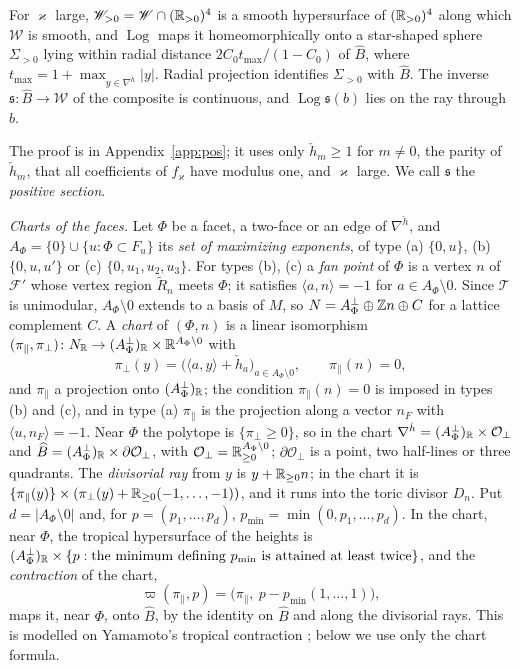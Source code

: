 \begin{lemma}\label{lem:pos}
For $\varkappa$ large, $\mathscr W_{>0}=\mathscr W\cap(\mathbb R_{>0})^4$ is a smooth hypersurface of $(\mathbb R_{>0})^4$ along which $\mathscr W$ is smooth, and
$\operatorname{Log}$ maps it homeomorphically onto a star-shaped sphere $\Sigma_{>0}$ lying within radial distance
$2C_0t_{\max}/(1-C_0)$ of $\widehat B$, where $t_{\max}=1+\max_{y\in\nabla^{\check h}}|y|$. Radial projection identifies
$\Sigma_{>0}$ with $\widehat B$. The inverse $\mathfrak s\colon\widehat B\to \mathscr W$ of the composite is continuous, and
$\operatorname{Log}\mathfrak s(b)$ lies on the ray through $b$.
\end{lemma}
The proof is in Appendix~\ref{app:pos}; it uses only $\check h_m\ge1$ for $m\neq0$, the parity of $\check h_m$, that all
coefficients of $f_\varkappa$ have modulus one, and $\varkappa$ large. We call $\mathfrak s$ the \emph{positive section}.

\emph{Charts of the faces.} Let $\Phi$ be a facet, a two-face or an edge of $\nabla^{\check h}$, and
$A_\Phi=\{0\}\cup\{u:\Phi\subset F_u\}$ its \emph{set of maximizing exponents}, of type (a) $\{0,u\}$, (b) $\{0,u,u'\}$ or (c)
$\{0,u_1,u_2,u_3\}$. For types (b), (c) a \emph{fan point} of $\Phi$ is a vertex $n$ of $\mathcal F'$ whose vertex region
$\widetilde R_n$ meets $\Phi$; it satisfies $\langle a,n\rangle=-1$ for $a\in A_\Phi\setminus0$. Since $\mathcal T$ is
unimodular, $A_\Phi\setminus0$ extends to a basis of $M$, so $N=A_\Phi^\perp\oplus\mathbb Z n\oplus C$ for a lattice complement
$C$. A \emph{chart} of $(\Phi,n)$ is a linear isomorphism
$(\pi_\parallel,\pi_\perp)\colon N_\mathbb R\to(A_\Phi^\perp)_\mathbb R\times\mathbb R^{A_\Phi\setminus0}$ with
\[
\pi_\perp(y)=\bigl(\langle a,y\rangle+\check h_a\bigr)_{a\in A_\Phi\setminus0},\qquad \pi_\parallel(n)=0 ,
\]
and $\pi_\parallel$ a projection onto $(A_\Phi^\perp)_\mathbb R$; the condition $\pi_\parallel(n)=0$ is imposed in types (b) and
(c), and in type (a) $\pi_\parallel$ is the projection along a vector $n_F$ with $\langle u,n_F\rangle=-1$. Near $\Phi$ the
polytope is $\{\pi_\perp\ge0\}$, so in the chart $\nabla^{\check h}=(A^\perp_\Phi)_\mathbb R\times\mathcal O_\perp$ and
$\widehat B=(A^\perp_\Phi)_\mathbb R\times\partial\mathcal O_\perp$, with $\mathcal O_\perp=\mathbb R^{A_\Phi\setminus0}_{\ge0}$;
$\partial\mathcal O_\perp$ is a point, two half-lines or three quadrants. The \emph{divisorial ray} from $y$ is $y+\mathbb R_{\ge0}n$; in the
chart it is $\{\pi_\parallel(y)\}\times(\pi_\perp(y)+\mathbb R_{\ge0}(-1,\dots,-1))$, and it runs into the toric divisor $D_n$.
Put $d=|A_\Phi\setminus0|$ and, for $p=(p_1,\ldots,p_d)$, $p_{\min}=\min(0,p_1,\ldots,p_d)$. In the chart, near $\Phi$, the
tropical hypersurface of the heights is $(A^\perp_\Phi)_\mathbb R\times\{p:\text{the minimum defining }p_{\min}\text{ is attained at least
twice}\}$, and the \emph{contraction} of the chart,
\[
\varpi(\pi_\parallel,p)=\bigl(\pi_\parallel,\ p-p_{\min}(1,\ldots,1)\bigr),
\]
maps it, near $\Phi$, onto $\widehat B$, by the identity on $\widehat B$ and along the divisorial rays. This is modelled on Yamamoto's tropical
contraction \cite{Ya21}; below we use only the chart formula.

